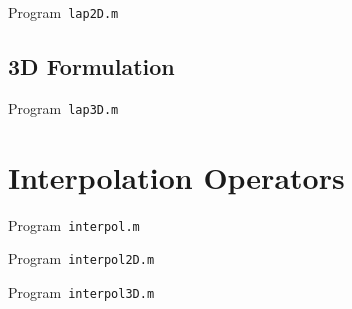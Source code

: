 \begin{listing}[ht!]
	\tiny
	\centering
	\caption{Program~\texttt{lap2D.m}}
	\label{code:lap2D.m}
\end{listing}

\subsection{3D Formulation}

\begin{listing}[ht!]
	\tiny
	\centering
	\caption{Program~\texttt{lap3D.m}}
	\label{code:lap3D.m}
\end{listing}

\section{Interpolation Operators}

\begin{listing}[ht!]
	\tiny
	\centering
	\caption{Program~\texttt{interpol.m}}
	\label{code:interpol.m}
\end{listing}

\begin{listing}[ht!]
	\tiny
	\centering
	\caption{Program~\texttt{interpol2D.m}}
	\label{code:interpol2D.m}
\end{listing}

\begin{listing}[ht!]
	\tiny
	\centering
	\caption{Program~\texttt{interpol3D.m}}
	\label{code:interpol3D.m}
\end{listing}



